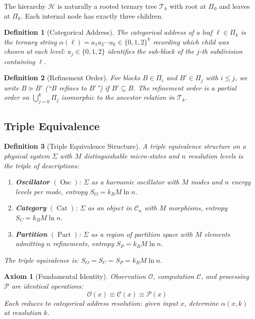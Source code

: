 \documentclass[12pt,twocolumn]{article}
\newtheorem{definition}{Definition}[section]
\newtheorem{axiom}{Axiom}[section]
\DeclareMathOperator{\Cat}{Cat}
\DeclareMathOperator{\Part}{Part}
\DeclareMathOperator{\Osc}{Osc}
\begin{document}
The hierarchy $\mathcal{H}$ is naturally a rooted ternary tree $\mathcal{T}_k$ with root at $\Pi_0$ and leaves at $\Pi_k$. Each internal node has exactly three children.

\begin{definition}[Categorical Address]
\label{def:categorical_address}
The \emph{categorical address} of a leaf $\ell \in \Pi_k$ is the ternary string $\alpha(\ell) = a_1 a_2 \cdots a_k \in \{0,1,2\}^k$ recording which child was chosen at each level: $a_j \in \{0,1,2\}$ identifies the sub-block of the $j$-th subdivision containing $\ell$.
\end{definition}

\begin{definition}[Refinement Order]
\label{def:refinement}
For blocks $B \in \Pi_i$ and $B' \in \Pi_j$ with $i \leq j$, we write $B \succeq B'$ (``$B$ refines to $B'$'') if $B' \subseteq B$. The refinement order is a partial order on $\bigcup_{j=0}^k \Pi_j$ isomorphic to the ancestor relation in $\mathcal{T}_k$.
\end{definition}

\subsection{Triple Equivalence}

\begin{definition}[Triple Equivalence Structure]
\label{def:triple_structure}
A \emph{triple equivalence structure} on a physical system $\Sigma$ with $M$ distinguishable micro-states and $n$ resolution levels is the triple of descriptions:
\begin{enumerate}
\item \textbf{Oscillator} $(\Osc)$: $\Sigma$ as a harmonic oscillator with $M$ modes and $n$ energy levels per mode, entropy $S_O = k_B M \ln n$.
\item \textbf{Category} $(\Cat)$: $\Sigma$ as an object in $\mathcal{C}_n$ with $M$ morphisms, entropy $S_C = k_B M \ln n$.
\item \textbf{Partition} $(\Part)$: $\Sigma$ as a region of partition space with $M$ elements admitting $n$ refinements, entropy $S_P = k_B M \ln n$.
\end{enumerate}
The triple equivalence is: $S_O = S_C = S_P = k_B M \ln n$.
\end{definition}

\begin{axiom}[Fundamental Identity]
\label{ax:fundamental}
Observation $\mathcal{O}$, computation $\mathcal{C}$, and processing $\mathcal{P}$ are identical operations:
\begin{equation}
\label{eq:fundamental}
\mathcal{O}(x) \equiv \mathcal{C}(x) \equiv \mathcal{P}(x)
\end{equation}
Each reduces to categorical address resolution: given input $x$, determine $\alpha(x, k)$ at resolution $k$.
\end{axiom}
\end{document}
